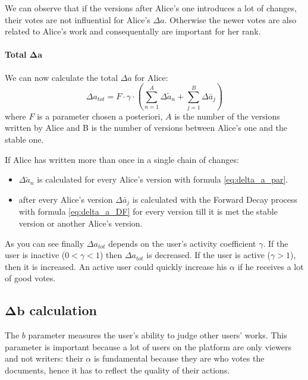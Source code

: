 \documentclass[a4paper,11pt]{article}
\newcommand{\al}{$\alpha$ }
\begin{document}
We can observe that if the versions after Alice's one introduces a lot of changes, their votes are not influential for Alice's $\Delta a$. Otherwise the newer votes are also related to Alice's work and consequentally are important for her rank.

\paragraph{Total $\boldsymbol{\Delta a}$} We can now calculate the total $\Delta a$ for Alice:
\begin{equation}
\Delta a_{tot} = F \cdot \gamma \cdot \left(\sum_{n=1}^A \Delta \tilde{a}_n + \sum_{j=1}^B \Delta \bar{a}_j\right)
\end{equation}
where $F$ is a parameter chosen a posteriori, $A$ is the number of the versions written by Alice and B is the number of versions between Alice's one and the stable one.

If Alice has written more than once in a single chain of changes:
\begin{itemize}
\item $\Delta \tilde{a}_n$  is calculated for every Alice's version with formula \ref{eq:delta_a_par}.
\item after every Alice's version $\Delta \bar{a}_j$ is calculated with the Forward Decay process with formula \ref{eq:delta_a_DF} for every version till it is met the stable version or another Alice's version.
\end{itemize}
As you can see finally $\Delta a_{tot}$ depends on the user's activity coefficient $\gamma$. If the user is inactive ($0 < \gamma < 1$) then  $\Delta a_{tot}$ is decreased. If the user is active ($\gamma >1$), then it is increased. An active user could quickly increase his \al if he receives a lot of good votes. 

\subsection{$\mathbf{\Delta b}$ calculation} \label{sec:deltab}
The $b$ parameter measures the user's ability  to judge other users' works. This parameter is important because a lot of users on the platform are only viewers and not writers: their \al is fundamental because they are who votes the documents, hence it has to reflect the quality of their actions.
\end{document}
